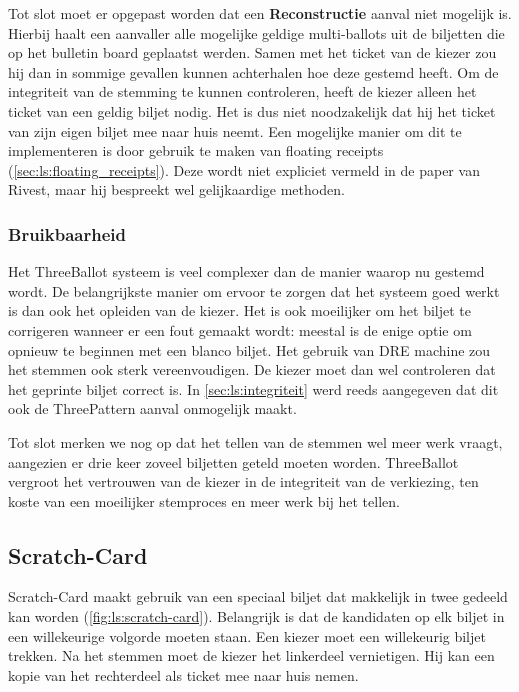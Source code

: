 \npar Tot slot moet er opgepast worden dat een \textbf{Reconstructie} aanval niet mogelijk is. Hierbij haalt een aanvaller alle mogelijke geldige multi-ballots uit de biljetten die op het bulletin board geplaatst werden. Samen met het ticket van de kiezer zou hij dan in sommige gevallen kunnen achterhalen hoe deze gestemd heeft. Om de integriteit van de stemming te kunnen controleren, heeft de kiezer alleen het ticket van een geldig biljet nodig. Het is dus niet noodzakelijk dat hij het ticket van zijn eigen biljet mee naar huis neemt. Een mogelijke manier om dit te implementeren is door gebruik te maken van floating receipts (\ref{sec:ls:floating_receipts}). Deze wordt niet expliciet vermeld in de paper van Rivest, maar hij bespreekt wel gelijkaardige methoden.\cite{rivest_threeballot}

\subsubsection{Bruikbaarheid}

Het ThreeBallot systeem is veel complexer dan de manier waarop nu gestemd wordt. De belangrijkste manier om ervoor te zorgen dat het systeem goed werkt is dan ook het opleiden van de kiezer. Het is ook moeilijker om het biljet te corrigeren wanneer er een fout gemaakt wordt: meestal is de enige optie om opnieuw te beginnen met een blanco biljet. Het gebruik van DRE machine zou het stemmen ook sterk vereenvoudigen. De kiezer moet dan wel controleren dat het geprinte biljet correct is. In \ref{sec:ls:integriteit} werd reeds aangegeven dat dit ook de ThreePattern aanval onmogelijk maakt.

\npar Tot slot merken we nog op dat het tellen van de stemmen wel meer werk vraagt, aangezien er drie keer zoveel biljetten geteld moeten worden. ThreeBallot vergroot het vertrouwen van de kiezer in de integriteit van de verkiezing, ten koste van een moeilijker stemproces en meer werk bij het tellen.

\subsection{Scratch-Card}
\label{sec:ls:scratch_card}

Scratch-Card\cite{randell_ryan_voting_technologies_and_trust} maakt gebruik van een speciaal biljet dat makkelijk in twee gedeeld kan worden (\ref{fig:ls:scratch-card}). Belangrijk is dat de kandidaten op elk biljet in een willekeurige volgorde moeten staan. Een kiezer moet een willekeurig biljet trekken. Na het stemmen moet de kiezer het linkerdeel vernietigen. Hij kan een kopie van het rechterdeel als ticket mee naar huis nemen.

